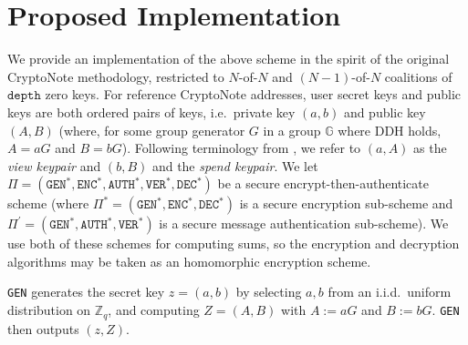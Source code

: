 \documentclass[12pt,english,oneside]{mrl}
\theoremstyle{definition}
\numberwithin{equation}{section}
\numberwithin{figure}{section}
\numberwithin{equation}{section}
\numberwithin{equation}{section}
\numberwithin{figure}{section}
\begin{document}
\section{Proposed Implementation}\label{sec:implement}

We provide an implementation of the above scheme in the spirit of the original CryptoNote methodology, restricted to $N$-of-$N$ and $(N-1)$-of-$N$ coalitions of $\texttt{depth}$ zero keys. For reference CryptoNote addresses, user secret keys and public keys are both ordered pairs of keys, i.e.\ private key $(a,b)$ and public key $(A,B)$ (where, for some group generator $G$ in a group $\mathbb{G}$ where DDH holds, $A=aG$ and $B=bG$). Following terminology from \cite{van2013cryptonote}, we refer to $(a,A)$ as the \textit{view keypair} and $(b,B)$ and the \textit{spend keypair}.  We let $\Pi = (\texttt{GEN}^*,\texttt{ENC}^*, \texttt{AUTH}^*, \texttt{VER}^*, \texttt{DEC}^*)$ be a secure encrypt-then-authenticate scheme (where $\Pi^* = (\texttt{GEN}^*,\texttt{ENC}^*, \texttt{DEC}^*)$ is a secure encryption sub-scheme and $\Pi^{\prime} = (\texttt{GEN}^*,\texttt{AUTH}^*, \texttt{VER}^*)$ is a secure message authentication sub-scheme). We use both of these schemes for computing sums, so the encryption and decryption algorithms may be taken as an homomorphic encryption scheme.

\texttt{GEN} generates the secret key $z=(a,b)$ by selecting $a,b$ from an i.i.d.\ uniform distribution on $\mathbb{Z}_q$, and computing $Z=(A,B)$ with $A:=aG$ and $B:=bG$. \texttt{GEN} then outputs $(z,Z)$.
\end{document}
